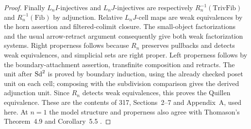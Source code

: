 \begin{proof}
Finally $L_nI$-injectives and $L_nJ$-injectives are respectively
$R_n^{-1}(\mathrm{TrivFib})$ and $R_n^{-1}(\mathrm{Fib})$ by
adjunction. Relative $L_nJ$-cell maps are weak equivalences by the
horn assertion and filtered-colimit closure. The small-object
factorizations and the usual arrow-retract argument consequently
give both weak factorization systems. Right properness follows
because $R_n$ preserves pullbacks and detects weak equivalences,
and simplicial sets are right proper. Left properness follows by
the boundary-attachment assertion, transfinite composition and
retracts. The unit after $\mathrm{Sd}^2$ is proved by boundary induction,
using the already checked poset unit on each cell; composing with
the subdivision comparison gives the derived adjunction unit.
Since $R_n$ detects weak equivalences, this proves the Quillen
equivalence. These are the contents of 317, Sections~2--7 and
Appendix~A, used here. At $n=1$ the model structure and properness
also agree with Thomason's Theorem~4.9 and Corollary~5.5
\cite{I_Thomason1980}.
\end{proof}

